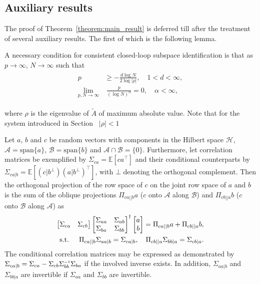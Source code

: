 \subsection{Auxiliary results}
The proof of Theorem~\ref{theorem:main_result} is deferred till after the treatment of several auxiliary results. The first of which is the following lemma.
\setcounter{thm}{0}
\begin{lem}\label{lem:relative_rates}\citep{Bauer2002,Chiuso2006}
    A necessary condition for consistent closed-loop subspace identification is that as $p\rightarrow\infty$, $N\rightarrow\infty$ such that
    \begin{align}\label{eq:relative_rates}
        \begin{split}
            p &\geq -\frac{d\log N}{2\log|\rho|}, \quad 1 < d < \infty,\\
            \lim_{p,N\rightarrow\infty} &\; \frac{p}{(\log N)^\alpha}=0, \quad \alpha < \infty,
        \end{split}
    \end{align}
\end{lem}
where $\rho$ is the eigenvalue of $\tilde{A}$ of maximum absolute value. Note that for the system introduced in Section~ $|\rho|<1$

\begin{lem}\label{lem:oblique_projections}\citep[Lemma~1]{VanOverschee1994,Katayama1999} Let $a$, $b$ and $c$ be random vectors with components in the Hilbert space $\mathscr{H}$, $\mathscr{A}=\text{span}\{a\}$, $\mathscr{B}=\text{span}\{b\}$ and $\mathscr{A}\cap\mathscr{B}=\{0\}$. Furthermore, let correlation matrices be exemplified by $\Sigma_{ca}=\mathbb{E}[ca^\top]$ and their conditional counterparts by $\Sigma_{ca|b}=\mathbb{E}[(c|b^\bot)(a|b^\bot)^\top]$, with $\bot$ denoting the orthogonal complement. Then the orthogonal projection of the row space of $c$ on the joint row space of $a$ and $b$ is the sum of the oblique projections $\Pi_{ca||b}a$ ($c$ onto $\mathscr{A}$ along $\mathscr{B}$) and $\Pi_{cb||a}b$ ($c$ onto $\mathscr{B}$ along $\mathscr{A}$) as
\begin{align}
    \begin{bmatrix}
        \Sigma_{ca} & \Sigma_{cb}
    \end{bmatrix}
    \begin{bmatrix}
        \Sigma_{aa} & \Sigma_{ab}\\ \Sigma_{ba} & \Sigma_{bb}
    \end{bmatrix}^\dagger
    \begin{bmatrix}
        a \\ b
    \end{bmatrix} = \Pi_{ca||b} a + \Pi_{cb||a} b,\label{eq:oblique_project}\\
    \text{s.t. }\quad\Pi_{ca||b}\Sigma_{aa|b} = \Sigma_{ca|b},\quad \Pi_{cb||a}\Sigma_{bb|a} = \Sigma_{cb|a}.\notag
\end{align}
The conditional correlation matrices may be expressed as demonstrated by $\Sigma_{ca|b}=\Sigma_{ca}-\Sigma_{cb}\Sigma_{bb}\inv\Sigma_{ba}$ if the involved inverse exists. In addition, $\Sigma_{aa|b}$ and $\Sigma_{bb|a}$ are invertible if $\Sigma_{aa}$ and $\Sigma_{bb}$ are invertible.
\end{lem}
